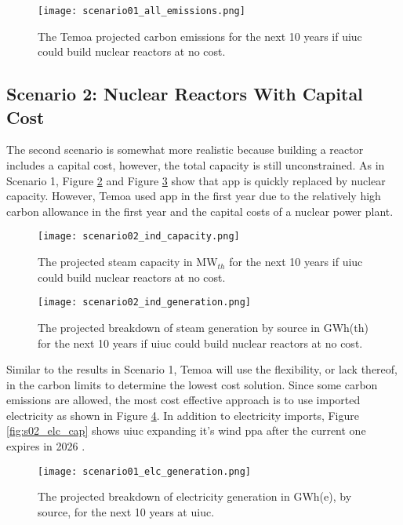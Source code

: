 \begin{figure}[ht!]
	\centering
	\texttt{[image: scenario01\_all\_emissions.png]}
	\caption{The Temoa projected carbon emissions for the next 10 years if
	\gls{uiuc} could build nuclear reactors at no cost.}
	\label{fig:s01_all_co2}
\end{figure}


\subsection{Scenario 2: Nuclear Reactors With Capital Cost}

The second scenario is somewhat more realistic because building a reactor
includes a capital cost, however, the total capacity is still unconstrained.
As in Scenario 1, Figure \ref{fig:s02_ind_cap} and Figure \ref{fig:s02_ind_gen}
show that \gls{app} is quickly replaced by nuclear capacity. However, Temoa
used \gls{app} in the first year due to the relatively high carbon allowance in
the first year and the capital costs of a nuclear power plant.

\begin{figure}[ht!]
	\centering
	\texttt{[image: scenario02\_ind\_capacity.png]}
	\caption{The projected steam capacity in MW$_{th}$ for the next 10 years
	if \gls{uiuc} could build nuclear reactors at no cost.}
	\label{fig:s02_ind_cap}
\end{figure}

\begin{figure}[ht!]
	\centering
	\texttt{[image: scenario02\_ind\_generation.png]}
	\caption{The projected breakdown of steam generation by source in GWh(th)
	for the next 10 years if \gls{uiuc} could build nuclear reactors at no cost.}
	\label{fig:s02_ind_gen}
\end{figure}

Similar to the results in Scenario 1, Temoa will use the flexibility, or lack
thereof, in the carbon limits to determine the lowest cost solution. Since some
carbon emissions are allowed, the most cost effective approach is to use
imported electricity as shown in Figure \ref{fig:s02_elc_gen}. In addition to
electricity imports, Figure \ref{fig:s02_elc_cap} shows \gls{uiuc} expanding
it's wind \gls{ppa} after the current one expires in 2026
\cite{breitweiser_wind_2016}.

\begin{figure}[ht!]
	\centering
	\texttt{[image: scenario01\_elc\_generation.png]}
	\caption{The projected breakdown of electricity generation in GWh(e), by
	source, for the next 10 years at
	\gls{uiuc}.}
	\label{fig:s02_elc_gen}
\end{figure}

